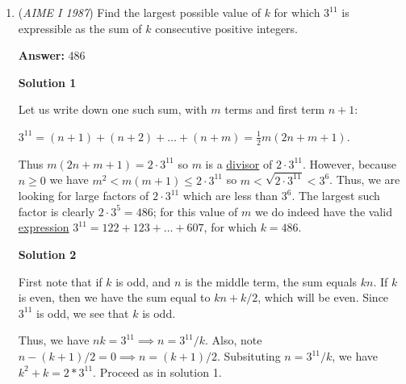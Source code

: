 \begin{enumerate}
\textbf{Solution 5 (simple)}

WLOG, let Al's speed be $15$ steps per second, so Bob's speed is $5$ steps per second. Then, Al was on the escalator for $\frac{150}{15}\ = 10$ seconds and Bob was on the escalator for $\frac{75}{5}\ = 15$ seconds. Let $r$ be the rate of the escalator, in steps per second. Then, the total amount of steps is $150 - 10r = 75 + 15r$. Al is getting $10$ seconds of resistance at rate $r$ from the escalator, while Bob is getting $15$ seconds of help at rate $r$. Solving for $r$, we have $r = 3$ steps per second. Then, we can plug $r$ into the previous equation or subtract/add it to Al/Bob's rate (respectively) then multiply by their respective time. Either way, we get $\boxed{120}$ and we are done.

 


	\item (\textit{AIME I 1987}) Find the largest possible value of $k$ for which $3^{11}$ is expressible as the sum of $k$ consecutive positive integers.


 
 \textbf{Answer: }486



\textbf{Solution 1}

Let us write down one such sum, with $m$ terms and first term $n + 1$:

 $3^{11} = (n + 1) + (n + 2) + \ldots + (n + m) = \frac{1}{2} m(2n + m + 1)$.

 Thus $m(2n + m + 1) = 2 \cdot 3^{11}$ so $m$ is a \href{https://artofproblemsolving.com/wiki/index.php?title=Divisor}{divisor} of $2\cdot 3^{11}$.  However, because $n \geq 0$ we have $m^2 < m(m + 1) \leq 2\cdot 3^{11}$ so $m < \sqrt{2\cdot 3^{11}} < 3^6$.  Thus, we are looking for large factors of $2\cdot 3^{11}$ which are less than $3^6$.  The largest such factor is clearly $2\cdot 3^5 = 486$; for this value of $m$ we do indeed have the valid \href{https://artofproblemsolving.com/wiki/index.php?title=Expression}{expression} $3^{11} = 122 + 123 + \ldots + 607$, for which $k=\boxed{486}$.

 



\textbf{Solution 2}

First note that if $k$ is odd, and $n$ is the middle term, the sum equals $kn$. If $k$ is even, then we have the sum equal to $kn+k/2$, which will be even. Since $3^{11}$ is odd, we see that $k$ is odd. 

 Thus, we have $nk=3^{11} \implies n=3^{11}/k$. Also, note $n-(k+1)/2=0 \implies n=(k+1)/2.$ Subsituting $n=3^{11}/k$, we have $k^2+k=2*3^{11}$. Proceed as in solution 1.


\end{enumerate}
